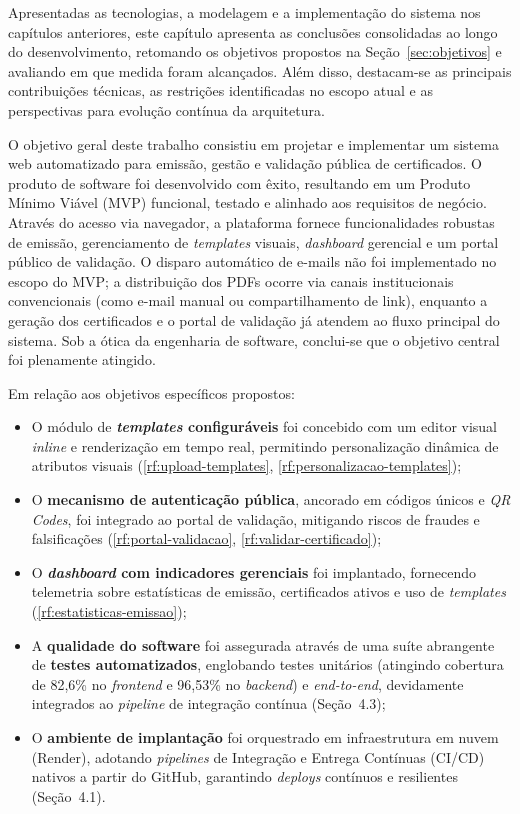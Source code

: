
Apresentadas as tecnologias, a modelagem e a implementação do sistema nos capítulos anteriores, este capítulo apresenta as conclusões consolidadas ao longo do desenvolvimento, retomando os objetivos propostos na Seção~\ref{sec:objetivos} e avaliando em que medida foram alcançados. Além disso, destacam-se as principais contribuições técnicas, as restrições identificadas no escopo atual e as perspectivas para evolução contínua da arquitetura.

O objetivo geral deste trabalho consistiu em projetar e implementar um sistema web automatizado para emissão, gestão e validação pública de certificados. O produto de software foi desenvolvido com êxito, resultando em um Produto Mínimo Viável (MVP) funcional, testado e alinhado aos requisitos de negócio. Através do acesso via navegador, a plataforma fornece funcionalidades robustas de emissão, gerenciamento de \textit{templates} visuais, \textit{dashboard} gerencial e um portal público de validação. O disparo automático de e-mails não foi implementado no escopo do MVP; a distribuição dos PDFs ocorre via canais institucionais convencionais (como e-mail manual ou compartilhamento de link), enquanto a geração dos certificados e o portal de validação já atendem ao fluxo principal do sistema. Sob a ótica da engenharia de software, conclui-se que o objetivo central foi plenamente atingido.

Em relação aos objetivos específicos propostos:

\begin{itemize}
    \item O módulo de \textbf{\textit{templates} configuráveis} foi concebido com um editor visual \textit{inline} e renderização em tempo real, permitindo personalização dinâmica de atributos visuais (\ref{rf:upload-templates}, \ref{rf:personalizacao-templates});
    \item O \textbf{mecanismo de autenticação pública}, ancorado em códigos únicos e \textit{QR Codes}, foi integrado ao portal de validação, mitigando riscos de fraudes e falsificações (\ref{rf:portal-validacao}, \ref{rf:validar-certificado});
    \item O \textbf{\textit{dashboard} com indicadores gerenciais} foi implantado, fornecendo telemetria sobre estatísticas de emissão, certificados ativos e uso de \textit{templates} (\ref{rf:estatisticas-emissao});
    \item A \textbf{qualidade do software} foi assegurada através de uma suíte abrangente de \textbf{testes automatizados}, englobando testes unitários (atingindo cobertura de 82,6\% no \textit{frontend} e 96,53\% no \textit{backend}) e \textit{end-to-end}, devidamente integrados ao \textit{pipeline} de integração contínua (Seção~4.3);
    \item O \textbf{ambiente de implantação} foi orquestrado em infraestrutura em nuvem (Render), adotando \textit{pipelines} de Integração e Entrega Contínuas (CI/CD) nativos a partir do GitHub, garantindo \textit{deploys} contínuos e resilientes (Seção~4.1).
\end{itemize}

